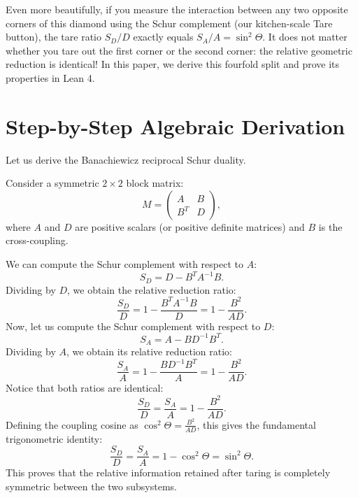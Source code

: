 \documentclass[11pt,a4paper]{article}
\theoremstyle{definition}
\begin{document}
Even more beautifully, if you measure the interaction between any two opposite corners of this diamond using the Schur complement (our kitchen-scale Tare button), the tare ratio $S_D/D$ exactly equals $S_A/A = \sin^2\Theta$. It does not matter whether you tare out the first corner or the second corner: the relative geometric reduction is identical! In this paper, we derive this fourfold split and prove its properties in Lean 4.


\section{Step-by-Step Algebraic Derivation}

Let us derive the Banachiewicz reciprocal Schur duality.

Consider a symmetric $2 \times 2$ block matrix:
\begin{equation}
M = \begin{pmatrix} A & B \\ B^T & D \end{pmatrix},
\end{equation}
where $A$ and $D$ are positive scalars (or positive definite matrices) and $B$ is the cross-coupling.

We can compute the Schur complement with respect to $A$:
\begin{equation}
S_D = D - B^T A^{-1} B.
\end{equation}
Dividing by $D$, we obtain the relative reduction ratio:
\begin{equation}
\frac{S_D}{D} = 1 - \frac{B^T A^{-1} B}{D} = 1 - \frac{B^2}{AD}.
\end{equation}
Now, let us compute the Schur complement with respect to $D$:
\begin{equation}
S_A = A - B D^{-1} B^T.
\end{equation}
Dividing by $A$, we obtain its relative reduction ratio:
\begin{equation}
\frac{S_A}{A} = 1 - \frac{B D^{-1} B^T}{A} = 1 - \frac{B^2}{AD}.
\end{equation}
Notice that both ratios are identical:
\begin{equation}
\frac{S_D}{D} = \frac{S_A}{A} = 1 - \frac{B^2}{AD}.
\end{equation}
Defining the coupling cosine as $\cos^2\Theta = \frac{B^2}{AD}$, this gives the fundamental trigonometric identity:
\begin{equation}
\frac{S_D}{D} = \frac{S_A}{A} = 1 - \cos^2\Theta = \sin^2\Theta.
\end{equation}
This proves that the relative information retained after taring is completely symmetric between the two subsystems.
\end{document}
